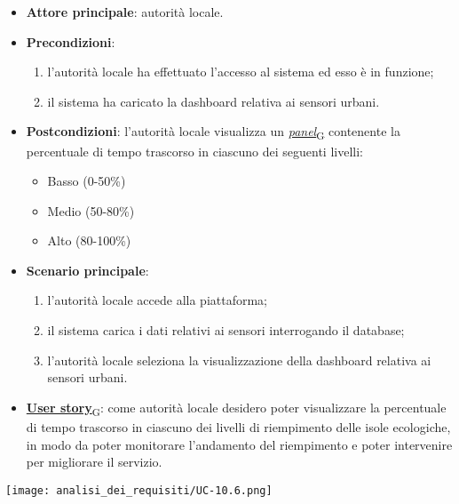 \begin{itemize}
	\item \textbf{Attore principale}: autorità locale.
	\item \textbf{Precondizioni}:
	      \begin{enumerate}
		      \item l'autorità locale ha effettuato l'accesso al sistema ed esso è in funzione;
		      \item il sistema ha caricato la dashboard relativa ai sensori urbani.
	      \end{enumerate}
	\item \textbf{Postcondizioni}: l'autorità locale visualizza un \href{https://7last.github.io/docs/pb/documentazione-interna/glossario\#panel}{\textit{panel}\textsubscript{G}} contenente la percentuale di tempo trascorso in ciascuno dei seguenti livelli:
	      \begin{itemize}
		      \item Basso (0-50\%)
		      \item Medio (50-80\%)
		      \item Alto (80-100\%)
	      \end{itemize}
	\item \textbf{Scenario principale}:
	      \begin{enumerate}
		      \item l'autorità locale accede alla piattaforma;
		      \item il sistema carica i dati relativi ai sensori interrogando il database;
		      \item l'autorità locale seleziona la visualizzazione della dashboard relativa ai sensori urbani.
	      \end{enumerate}
	\item \href{https://7last.github.io/docs/pb/documentazione-interna/glossario\#user-story}{\textbf{User story}\textsubscript{G}}:
	      come autorità locale desidero poter visualizzare la percentuale di tempo trascorso in ciascuno dei livelli di riempimento delle isole ecologiche,
	      in modo da poter monitorare l'andamento del riempimento e poter intervenire per migliorare il servizio.
\end{itemize}
\begin{center}
	\texttt{[image: analisi\_dei\_requisiti/UC-10.6.png]}
\end{center}

